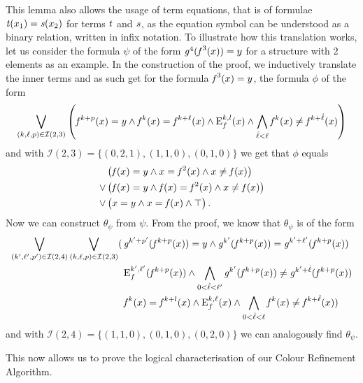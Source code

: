 This lemma also allows the usage of term equations, that is of formulae $\operatorname{\mathit{t}}(x_1)=\operatorname{\mathit{s}}(x_2)$ for terms $\operatorname{\mathit{t}}$ and $\operatorname{\mathit{s}}$, as the equation symbol can be understood as a binary relation, written in infix notation.
To illustrate how this translation works, let us consider the formula $\psi$ of the form $\operatorname{\mathit{g}}^4(\operatorname{\mathit{f}}^3(x))=y$ for a structure with $2$ elements as an example.
In the construction of the proof, we inductively translate the inner terms and as such get for the formula $\operatorname{\mathit{f}}^3(x)=y$, the formula $\phi$ of the form
$$\bigvee_{(k,\ell,p)\in \mathcal I(2,3)}\left(\operatorname{\mathit{f}}^{k+p}(x)=y \land \operatorname{\mathit{f}}^k(x)=\operatorname{\mathit{f}}^{k+\ell}(x) \land \operatorname{E}^{k,l}_f(x)\land\bigwedge_{\hat \ell < \ell} \operatorname{\mathit{f}}^k(x)\neq \operatorname{\mathit{f}}^{k+\hat\ell}(x)\right)$$
and with $\mathcal I(2,3)=\{(0,2,1),(1,1,0),(0,1,0)\}$ we get that $\phi$ equals
\begin{align*}
	\phantom{\lor}&\left(\operatorname{\mathit{f}}(x)=y \land x=\operatorname{\mathit{f}}^2(x) \land x\neq \operatorname{\mathit{f}}(x)\right) \\
	\lor & \left(\operatorname{\mathit{f}}(x)=y \land \operatorname{\mathit{f}}(x)=\operatorname{\mathit{f}}^2(x) \land x \neq \operatorname{\mathit{f}}(x)\right) \\
	\lor & \left(x=y \land x=\operatorname{\mathit{f}}(x) \land \top\vphantom{f^2} \right).
\end{align*}
Now we can construct $\theta_\psi$ from $\psi$. 
From the proof, we know that $\theta_\psi$ is of the form
\begin{align*}
	\bigvee_{(k',\ell',p')\in \mathcal I(2,4)} \bigvee_{(k,\ell,p)\in \mathcal I(2,3)} (
	& \operatorname{\mathit{g}}^{k'+p'}(\operatorname{\mathit{f}}^{k+p}(x))=y \land \operatorname{\mathit{g}}^{k'}(\operatorname{\mathit{f}}^{k+p}(x))=\operatorname{\mathit{g}}^{k'+\ell'}(\operatorname{\mathit{f}}^{k+p}(x)) \\
	& \operatorname{E}^{k',\ell'}_f(\operatorname{\mathit{f}}^{k+p}(x)) \land \bigwedge_{0<\hat{\ell}<\ell'} \operatorname{\mathit{g}}^{k'}(\operatorname{\mathit{f}}^{k+p}(x))\neq \operatorname{\mathit{g}}^{k'+\hat{\ell}}(\operatorname{\mathit{f}}^{k+p}(x)) \\
	& \operatorname{\mathit{f}}^k(x)=\operatorname{\mathit{f}}^{k+l}(x) \land \operatorname{E}^{k,\ell}_f(x) \land \bigwedge_{0<\hat{\ell}<\ell} \operatorname{\mathit{f}}^k(x)\neq \operatorname{\mathit{f}}^{k+\hat{\ell}}(x)
	)
\end{align*}
and with $\mathcal I(2,4)=\{(1,1,0),(0,1,0), (0,2,0)\}$ we can analogously find $\theta_\psi$.

This now allows us to prove the logical characterisation of our Colour Refinement Algorithm.

